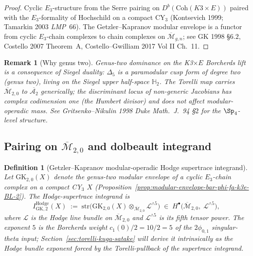 \documentclass[11pt]{article}
\newtheorem{definition}[theorem]{Definition}
\newtheorem{remark}[theorem]{Remark}
\providecommand{\Ethree}{E_3}
\providecommand{\Coh}{\mathrm{Coh}}
\providecommand{\cA}{\mathcal{A}}
\providecommand{\cL}{\mathcal{L}}
\providecommand{\HHH}{\mathbb{H}}
\providecommand{\Mbar}{\overline{\mathcal M}}
\providecommand{\str}{\mathrm{str}}
\begin{document}
\begin{proof}
Cyclic $\Ethree$-structure from the Serre pairing on $D^b(\Coh(K3 \times E))$
paired with the $\Ethree$-formality of Hochschild on a compact CY$_3$
(Kontsevich 1999; Tamarkin 2003 \emph{LMP}~66). The Getzler--Kapranov
modular envelope is a functor from cyclic $\Ethree$-chain complexes to
chain complexes on $\Mbar_{g, n}$; see GK 1998 \S$6.2$, Costello 2007
Theorem~A, Costello--Gwilliam 2017 Vol II Ch.~11.
\end{proof}

\begin{remark}[Why genus two]
Genus-two dominance on the K3$\times E$ Borcherds lift is a consequence
of Siegel duality: $\Delta_5$ is a paramodular cusp form of \emph{degree two}
(genus two), living on the Siegel upper half-space $\HHH_2$. The Torelli
map carries $\Mbar_{2, 0}$ to $\overline{\cA_2}$ generically; the
discriminant locus of non-generic Jacobians has complex codimension
one (the Humbert divisor) and does not affect modular-operadic mass.
See Gritsenko--Nikulin 1998 \emph{Duke Math.\ J.}~94 \S$2$ for the
$\Sp_4$-level structure.
\end{remark}

\subsection{Pairing on $\Mbar_{2, 0}$ and dolbeault integrand}

\begin{definition}[Getzler--Kapranov modular-operadic Hodge supertrace integrand]
\label{def:gk-integrand-k3e-BL-2}
Let $\mathrm{GK}_{2, 0}(X)$ denote the genus-two modular envelope of a
cyclic $\Ethree$-chain complex on a compact CY$_3$ $X$ (Proposition~\ref{prop:modular-envelope-bar-phi-fa-k3e-BL-2}).
The \emph{Hodge-supertrace integrand} is
\begin{equation}
\label{eq:gk-integrand-BL-2}
  I^{\mathrm{Hodge}}_{\mathrm{GK}, 2}(X)
  \;:=\; \str\!\bigl(
    \mathrm{GK}_{2, 0}(X)
    \otimes_{\Mbar_{2, 0}} \cL^{\wedge 5}
  \bigr)
  \;\in\;
  H^\bullet\!\bigl(\Mbar_{2, 0},\; \cL^{\wedge 5}\bigr),
\end{equation}
where $\cL$ is the Hodge line bundle on $\Mbar_{2, 0}$ and $\cL^{\wedge 5}$
is its fifth tensor power. The exponent $5$ is the Borcherds weight
$c_1(0)/2 = 10/2 = 5$ of the $2\phi_{0, 1}$ singular-theta input;
Section~\ref{sec:torelli-kuga-satake} will derive it intrinsically as
the Hodge bundle exponent forced by the Torelli-pullback of the
supertrace integrand.
\end{definition}
\end{document}
